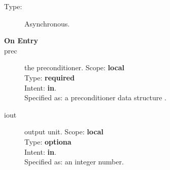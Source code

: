 

\begin{description}
\item[Type:] Asynchronous.
\item[\bf On Entry]
\item[prec] the preconditioner.
Scope: {\bf local} \\
Type: {\bf required}\\
Intent: {\bf in}.\\
Specified as: a preconditioner data structure \precdata.
\item[iout] output unit.
Scope: {\bf local} \\
Type: {\bf optiona}\\
Intent: {\bf in}.\\
Specified as: an integer number. 
\end{description}




